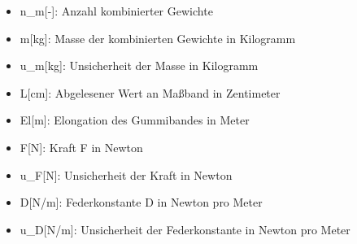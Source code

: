 \documentclass[class=article, crop=false]{standalone}
\providecommand{\tightlist}{%
  \setlength{\itemsep}{0pt}\setlength{\parskip}{0pt}}
\begin{document}
\begin{itemize}
\tightlist
\item
  n\_m{[}-{]}: Anzahl kombinierter Gewichte
\item
  m{[}kg{]}: Masse der kombinierten Gewichte in Kilogramm
\item
  u\_m{[}kg{]}: Unsicherheit der Masse in Kilogramm
\item
  L{[}cm{]}: Abgelesener Wert an Maßband in Zentimeter
\item
  El{[}m{]}: Elongation des Gummibandes in Meter
\item
  F{[}N{]}: Kraft F in Newton
\item
  u\_F{[}N{]}: Unsicherheit der Kraft in Newton
\item
  D{[}N/m{]}: Federkonstante D in Newton pro Meter
\item
  u\_D{[}N/m{]}: Unsicherheit der Federkonstante in Newton pro Meter
\end{itemize}
\end{document}
